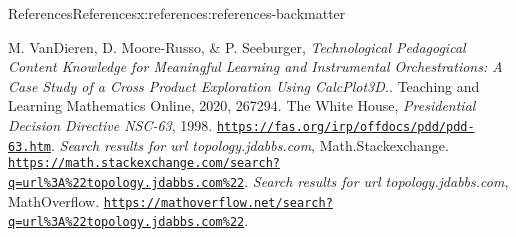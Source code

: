 \documentclass[oneside,10pt,]{article}
\begin{document}
\begin{references-section-numberless}{References}{}{References}{}{}{x:references:references-backmatter}
\begin{referencelist}
\hypertarget{x:biblio:biblio-calcplot3d}{}M. VanDieren, D. Moore-Russo, \& P. Seeburger, \textit{Technological Pedagogical Content Knowledge for Meaningful Learning and Instrumental Orchestrations: A Case Study of a Cross Product Exploration Using CalcPlot3D.}. Teaching and Learning Mathematics Online, 2020, 267\textendash{}294.
\hypertarget{x:biblio:biblio-prez}{}The White House, \textit{Presidential Decision Directive NSC-63}, 1998. \href{https://fas.org/irp/offdocs/pdd/pdd-63.htm}{\nolinkurl{https://fas.org/irp/offdocs/pdd/pdd-63.htm}}.
\hypertarget{x:biblio:biblio-mathse-search}{}\textit{Search results for url topology.jdabbs.com}, Math.Stackexchange. \href{https://math.stackexchange.com/search?q=url\%3A\%22topology.jdabbs.com\%22}{\nolinkurl{https://math.stackexchange.com/search?q=url\%3A\%22topology.jdabbs.com\%22}}.
\hypertarget{x:biblio:biblio-mo-search}{}\textit{Search results for url topology.jdabbs.com}, MathOverflow. \href{https://mathoverflow.net/search?q=url\%3A\%22topology.jdabbs.com\%22}{\nolinkurl{https://mathoverflow.net/search?q=url\%3A\%22topology.jdabbs.com\%22}}.
\end{referencelist}
\end{references-section-numberless}
\end{document}
